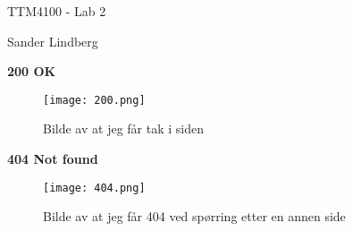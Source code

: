 \documentclass[12pt,a4paper]{article}
\begin{document}
\begin{titlepage}
    \centering
    \vspace*{\fill}

    \vspace*{0.5cm}

    \huge
    TTM4100 - Lab 2

    \vspace*{0.5cm}

    \large Sander Lindberg

    \vspace*{\fill}
    \end{titlepage}

	\newpage
	
	\textbf{200 OK}
	\begin{figure}[ht!]
		\centering
		\texttt{[image: 200.png]}
		\caption{Bilde av at jeg får tak i siden}
	\end{figure}
	
	\textbf{404 Not found}
	\begin{figure}[ht!]
		\centering
		\texttt{[image: 404.png]}
		\caption{Bilde av at jeg får 404 ved spørring etter en annen side}
	\end{figure}
	
\end{document}
